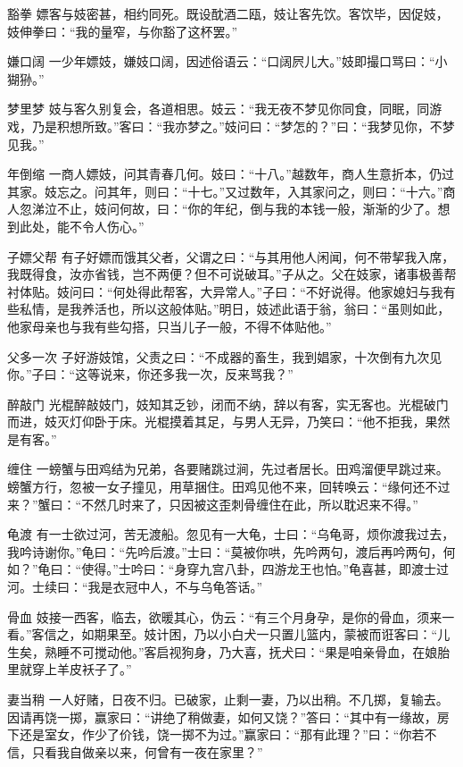 \documentclass[12pt,UTF8]{ctexbook}
\begin{document}
豁拳
嫖客与妓密甚，相约同死。既设酖酒二瓯，妓让客先饮。客饮毕，因促妓，妓伸拳曰：“我的量窄，与你豁了这杯罢。”

嫌口阔
一少年嫖妓，嫌妓口阔，因述俗语云：“口阔屄儿大。”妓即撮口骂曰：“小猢狲。”

梦里梦
妓与客久别复会，各道相思。妓云：“我无夜不梦见你同食，同眠，同游戏，乃是积想所致。”客曰：“我亦梦之。”妓问曰：“梦怎的？”曰：“我梦见你，不梦见我。”

年倒缩
一商人嫖妓，问其青春几何。妓曰：“十八。”越数年，商人生意折本，仍过其家。妓忘之。问其年，则曰：“十七。”又过数年，入其家问之，则曰：“十六。”商人忽涕泣不止，妓问何故，曰：“你的年纪，倒与我的本钱一般，渐渐的少了。想到此处，能不令人伤心。”

子嫖父帮
有子好嫖而饿其父者，父谓之曰：“与其用他人闲闻，何不带挈我入席，我既得食，汝亦省钱，岂不两便？但不可说破耳。”子从之。父在妓家，诸事极善帮衬体贴。妓问曰：“何处得此帮客，大异常人。”子曰：“不好说得。他家媳妇与我有些私情，是我养活也，所以这般体贴。”明日，妓述此语于翁，翁曰：“虽则如此，他家母亲也与我有些勾搭，只当儿子一般，不得不体贴他。”

父多一次
子好游妓馆，父责之曰：“不成器的畜生，我到娼家，十次倒有九次见你。”子曰：“这等说来，你还多我一次，反来骂我？”

醉敲门
光棍醉敲妓门，妓知其乏钞，闭而不纳，辞以有客，实无客也。光棍破门而进，妓灭灯仰卧于床。光棍摸着其足，与男人无异，乃笑曰：“他不拒我，果然是有客。”

缠住
一螃蟹与田鸡结为兄弟，各要赌跳过涧，先过者居长。田鸡溜便早跳过来。螃蟹方行，忽被一女子撞见，用草捆住。田鸡见他不来，回转唤云：“缘何还不过来？”蟹曰：“不然几时来了，只因被这歪刺骨缠住在此，所以耽迟来不得。”

龟渡
有一士欲过河，苦无渡船。忽见有一大龟，士曰：“乌龟哥，烦你渡我过去，我吟诗谢你。”龟曰：“先吟后渡。”士曰：“莫被你哄，先吟两句，渡后再吟两句，何如？”龟曰：“使得。”士吟曰：“身穿九宫八卦，四游龙王也怕。”龟喜甚，即渡士过河。士续曰：“我是衣冠中人，不与乌龟答话。”

骨血
妓接一西客，临去，欲暖其心，伪云：“有三个月身孕，是你的骨血，须来一看。”客信之，如期果至。妓计困，乃以小白犬一只置儿篮内，蒙被而诳客曰：“儿生矣，熟睡不可搅动他。”客启视狗身，乃大喜，抚犬曰：“果是咱亲骨血，在娘胎里就穿上羊皮袄子了。”

妻当稍
一人好赌，日夜不归。已破家，止剩一妻，乃以出稍。不几掷，复输去。因请再饶一掷，赢家曰：“讲绝了稍做妻，如何又饶？”答曰：“其中有一缘故，房下还是室女，作少了价钱，饶一掷不为过。”赢家曰：“那有此理？”曰：“你若不信，只看我自做亲以来，何曾有一夜在家里？”
\end{document}
